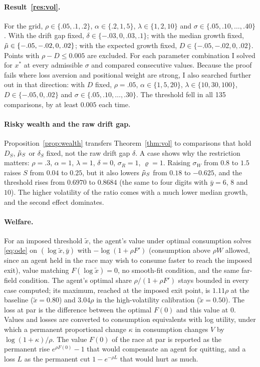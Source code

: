 \paragraph{Result~\ref{res:vol}.} For the grid, $\rho\in\{.05,.1,.2\}$, $\alpha\in\{.2,1,5\}$, $\lambda\in\{1,2,10\}$ and $\sigma\in\{.05,.10,\dots,.40\}$. With the drift gap fixed, $\delta\in\{-.03,0,.03,.1\}$; with the median growth fixed, $\tilde\mu\in\{-.05,-.02,0,.02\}$; with the expected growth fixed, $D\in\{-.05,-.02,0,.02\}$. Points with $\rho-D\le0.005$ are excluded. For each parameter combination I solved for $x^*$ at every admissible $\sigma$ and compared consecutive values. Because the proof fails where loss aversion and positional weight are strong, I also searched further out in that direction: with $D$ fixed, $\rho=.05$, $\alpha\in\{1,5,20\}$, $\lambda\in\{10,30,100\}$, $D\in\{-.05,0,.02\}$ and $\sigma\in\{.05,.10,\dots,.30\}$. The threshold fell in all 135 comparisons, by at least $0.005$ each time.

\paragraph{Risky wealth and the raw drift gap.} Proposition~\ref{prop:wealth} transfers Theorem~\ref{thm:vol} to comparisons that hold $D_S$, $\tilde\mu_S$ or $\delta_S$ fixed, not the raw drift gap $\delta$. A case shows why the restriction matters: $\rho=.3$, $\alpha=1$, $\lambda=1$, $\delta=0$, $\sigma_R=1$, $\varrho=1$. Raising $\sigma_W$ from $0.8$ to $1.5$ raises $S$ from $0.04$ to $0.25$, but it also lowers $\tilde\mu_S$ from $0.18$ to $-0.625$, and the threshold rises from $0.6970$ to $0.8684$ (the same to four digits with $\bar y=6$, $8$ and $10$). The higher volatility of the ratio comes with a much lower median growth, and the second effect dominates.

\paragraph{Welfare.} For an imposed threshold $\tilde x$, the agent's value under optimal consumption solves \eqref{eq:ode} on $(\log\tilde x,\bar y)$ with $-\log(1+\rho F')$ (consumption above $\rho W$ allowed, since an agent held in the race may wish to consume faster to reach the imposed exit), value matching $F(\log\tilde x)=0$, no smooth-fit condition, and the same far-field condition. The agent's optimal share $\rho/(1+\rho F')$ stays bounded in every case computed; its maximum, reached at the imposed exit point, is $1.11\rho$ at the baseline ($\tilde x=0.80$) and $3.04\rho$ in the high-volatility calibration ($\tilde x=0.50$). The loss at par is the difference between the optimal $F(0)$ and this value at $0$. Values and losses are converted to consumption equivalents with log utility, under which a permanent proportional change $\kappa$ in consumption changes $V$ by $\log(1+\kappa)/\rho$. The value $F(0)$ of the race at par is reported as the permanent rise $e^{\rho F(0)}-1$ that would compensate an agent for quitting, and a loss $L$ as the permanent cut $1-e^{-\rho L}$ that would hurt as much.

